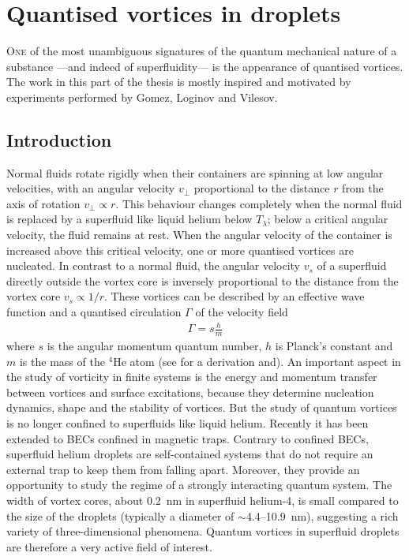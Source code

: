 \chapter{Quantised vortices in droplets}\label{sec:quant-vort}
	\lettrine[lines=4]{\color{activeColor}O}{ne} of the most unambiguous signatures of the quantum mechanical nature of a substance ---and indeed of superfluidity--- is the appearance of quantised vortices. The work in this part of the thesis is mostly inspired and motivated by experiments performed by Gomez, Loginov and Vilesov\citep{Gomez:2012,Gom14}.
	
	\section{Introduction}
		Normal fluids rotate rigidly when their containers are spinning at low angular velocities, with an angular velocity $v_\perp$ proportional to the distance $r$ from the axis of rotation $v_\perp\propto r$. This behaviour changes completely when the normal fluid is replaced by a superfluid like liquid helium below $T_\lambda$; below a critical angular velocity, the fluid remains at rest. When the angular velocity of the container is increased above this critical velocity, one or more quantised vortices are nucleated. In contrast to a normal fluid, the angular velocity $v_s$ of a superfluid directly outside the vortex core is inversely proportional to the distance from the vortex core $v_s\propto 1/r$. These vortices can be described by an effective wave function and a quantised circulation $\Gamma$ of the velocity field
		\begin{align}
			\Gamma=s\frac{h}{m}	
		\end{align}
		where $s$ is the angular momentum quantum number, $h$ is Planck’s constant and $m$ is the mass of the $^4$He atom (see  for a derivation and). An important aspect in the study of vorticity in finite systems is the energy and momentum transfer between vortices and surface excitations, because they determine nucleation dynamics, shape and the stability of vortices. But the study of quantum vortices is no longer confined to superfluids like liquid helium. Recently\citep{Pit03,Fetter2009} it has been extended to BECs confined in magnetic traps. Contrary to confined BECs, superfluid helium droplets are self-contained systems that do not require an external trap to keep them from falling apart. Moreover, they provide an opportunity to study the regime of a strongly interacting quantum system. The width of vortex cores, about 0.2~nm\citep{Don91} in superfluid helium-4, is small compared to the size of the droplets (typically a diameter of $\sim$4.4--10.9~nm), suggesting a rich variety of three-dimensional phenomena. Quantum vortices in superfluid droplets are therefore a very active field of interest\citep{Clo98,Lehmann2003,Bar06,Sti06}. 
		
